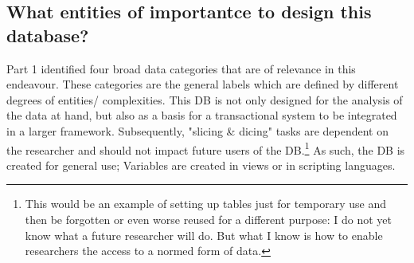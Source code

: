 \documentclass[a4paper]{article}
\begin{document}
\subsection{What entities of importantce to design this database?}
Part 1 identified four broad data categories that are of relevance in this endeavour. These categories are the general labels which are defined by different degrees of entities/ complexities. This DB is not only designed for the analysis of the data at hand, but also as a basis for a transactional system to be integrated in a larger framework. Subsequently, "slicing \& dicing" tasks are dependent on the researcher and should not impact future users of the DB.\footnote{This would be an example of setting up tables just for temporary use and then be forgotten or even worse reused for a different purpose: I do not yet know what a future researcher will do. But what I know is how to enable researchers the access to a normed form of data.} As such, the DB is created for general use; Variables are created in views or in scripting languages. 
\end{document}

